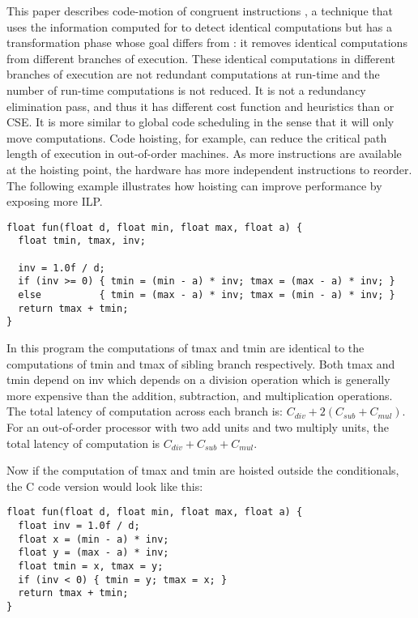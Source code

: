 \documentclass[acmlarge,review,anonymous]{acmart}\settopmatter{printfolios=true}
\begin{document}
This paper describes code-motion of congruent instructions \cite{briggs1997}, a
technique that uses the information computed for \PRE{} to detect identical
computations but has a transformation phase whose goal differs from \PRE{}: it
removes identical computations from different branches of execution.  These
identical computations in different branches of execution are not redundant
computations at run-time and the number of run-time computations is not
reduced. It is not a redundancy elimination pass, and thus it has different cost
function and heuristics than \PRE{} or CSE. It is more similar to global code
scheduling \cite{dragonbook,click1995global} in the sense that it will only move
computations. Code hoisting, for example, can reduce the critical path length of
execution in out-of-order machines. As more instructions are available at the
hoisting point, the hardware has more independent instructions to reorder. The
following example illustrates how hoisting can improve performance by exposing
more ILP.

\begin{verbatim}
float fun(float d, float min, float max, float a) {
  float tmin, tmax, inv;

  inv = 1.0f / d;
  if (inv >= 0) { tmin = (min - a) * inv; tmax = (max - a) * inv; }
  else          { tmin = (max - a) * inv; tmax = (min - a) * inv; }
  return tmax + tmin;
}
\end{verbatim}

In this program the computations of tmax and tmin are identical to the
computations of tmin and tmax of sibling branch respectively. Both tmax and tmin
depend on inv which depends on a division operation which is generally more
expensive than the addition, subtraction, and multiplication operations. The
total latency of computation across each branch is: $C_{div} + 2(C_{sub} +
C_{mul})$.  For an out-of-order processor with two add units and two multiply
units, the total latency of computation is $C_{div} + C_{sub} + C_{mul}$.

Now if the computation of tmax and tmin are hoisted outside the
conditionals, the C code version would look like this:
\begin{verbatim}
float fun(float d, float min, float max, float a) {
  float inv = 1.0f / d;
  float x = (min - a) * inv;
  float y = (max - a) * inv;
  float tmin = x, tmax = y;
  if (inv < 0) { tmin = y; tmax = x; }
  return tmax + tmin;
}

\end{verbatim}
\end{document}
